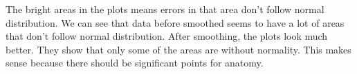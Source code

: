 The bright areas in the plots means errors in that area don't follow normal 
distribution. We can see that data before smoothed seems to have a lot of 
areas that don't follow normal distribution. After smoothing, the plots look 
much better. They show that only some of the areas are without normality. 
This makes sense because there should be significant points for anatomy.





